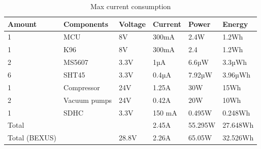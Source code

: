 \documentclass[ %
  a4paper, %
  11pt, %
  openany, %
  parskip, %
  toc=totoc, %
  listof=totoc, %
  bibliography=totoc %
]{scrreprt} %
\newcommand{\micro}{\textmu} %
\providecommand{\DIFaddbeginFL}{} %
\providecommand{\DIFaddendFL}{} %
\providecommand{\DIFdelbeginFL}{} %
\providecommand{\DIFdelendFL}{} %
\providecommand{\DIFscaledelfig}{0.5}
\newlength{\DIFdelgraphicswidth} %
\newlength{\DIFdelgraphicsheight} %
\providecommand{\DIFaddincludegraphics}[2][]{{\color{blue}\fbox{\DIFOincludegraphics[#1]{#2}}}} %
\providecommand{\DIFdelincludegraphics}[2][]{%
\sbox{\DIFdelgraphicsbox}{\DIFOincludegraphics[#1]{#2}}%
\settoboxwidth{\DIFdelgraphicswidth}{\DIFdelgraphicsbox} %
\settoboxtotalheight{\DIFdelgraphicsheight}{\DIFdelgraphicsbox} %
\scalebox{\DIFscaledelfig}{%
\parbox[b]{\DIFdelgraphicswidth}{\usebox{\DIFdelgraphicsbox}\\[-\baselineskip] \rule{\DIFdelgraphicswidth}{0em}}\llap{\resizebox{\DIFdelgraphicswidth}{\DIFdelgraphicsheight}{%
\setlength{\unitlength}{\DIFdelgraphicswidth}%
\begin{picture}(1,1)%
\thicklines\linethickness{2pt} %
{\color[rgb]{1,0,0}\put(0,0){\framebox(1,1){}}}%
{\color[rgb]{1,0,0}\put(0,0){\line( 1,1){1}}}%
{\color[rgb]{1,0,0}\put(0,1){\line(1,-1){1}}}%
\end{picture}%
}\hspace*{3pt}}} %
} %
\DeclareRobustCommand{\DIFaddbeginFL}{\DIFOaddbeginFL \let\includegraphics\DIFaddincludegraphics} %
\DeclareRobustCommand{\DIFaddendFL}{\DIFOaddendFL \let\includegraphics\DIFOincludegraphics} %
\DeclareRobustCommand{\DIFdelbeginFL}{\DIFOdelbeginFL \let\includegraphics\DIFdelincludegraphics} %
\DeclareRobustCommand{\DIFdelendFL}{\DIFOaddendFL \let\includegraphics\DIFOincludegraphics} %
\begin{document}
\begin{table}[H]
\centering
\caption{Max current consumption}
\label{tab:current_consumption}
\DIFdelbeginFL %
\DIFdelendFL \DIFaddbeginFL \begin{tabular}{llllll}
\toprule
\textbf{Amount} & \textbf{Components}& \textbf{Voltage} & \textbf{Current} &\textbf{Power} &\textbf{Energy}\\
\midrule
1 & MCU & 8V & 300mA & 2.4W & 1.2Wh\\
1 & K96 & 8V & 300mA & 2.4 & 1.2Wh \\
2 & MS5607 & 3.3V& 1µA & 6.6µW & 3.3µWh \\
6 & SHT45 & 3.3V & 0.4µA & 7.92µW & 3.96µWh \\
1 & Compressor & 24V & 1.25A & 30W & 15Wh \\
2 & Vacuum pumps & 24V & 0.42A & 20W & 10Wh\\
1 & SDHC & 3.3V & 150 mA & 0.495W & 0.248Wh \\
\midrule
Total &&& 2.45A & 55.295W & 27.648Wh\\
Total (BEXUS) &&28.8V& 2.26A & 65.05W & 32.526Wh \\
\bottomrule
\end{tabular}\DIFaddendFL 
\end{table}
\end{document}
